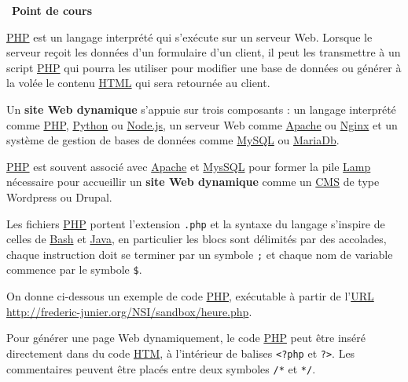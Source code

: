 \documentclass[
  11pt,
]{article}
\newcommand{\passthrough}[1]{#1}
\newcounter{cours}
\newenvironment{cours}[1]
{\par \medskip   \addtocounter{cours}{1} \noindent  
\begin{bclogo}[arrondi =0.1,  ombre = true, barre=none, logo=\bcbook, marge=4]{~\textbf{Point de cours} \textbf{\thecours} {\itshape #1} }  \par}
{
\end{bclogo}
 \par \bigskip }
\begin{document}
\begin{cours}{}

\href{https://developer.mozilla.org/fr/docs/Glossaire/PHP}{PHP} est un
langage interprété qui s'exécute sur un serveur Web. Lorsque le serveur
reçoit les données d'un formulaire d'un client, il peut les transmettre
à un script
\href{https://developer.mozilla.org/fr/docs/Glossaire/PHP}{PHP} qui
pourra les utiliser pour modifier une base de données ou générer à la
volée le contenu
\href{https://developer.mozilla.org/fr/docs/Glossaire/HTML}{HTML} qui
sera retournée au client.

Un \textbf{site Web dynamique} s'appuie sur trois composants : un
langage interprété comme
\href{https://developer.mozilla.org/fr/docs/Glossaire/PHP}{PHP},
\href{https://docs.python.org/3.7/library/cgi.html}{Python} ou
\href{https://developer.mozilla.org/fr/docs/Glossaire/Node.js}{Node.js},
un serveur Web comme \href{https://doc.ubuntu-fr.org/apache2}{Apache} ou
\href{https://doc.ubuntu-fr.org/nginx}{Nginx} et un système de gestion
de bases de données comme \href{https://doc.ubuntu-fr.org/mysql}{MySQL}
ou \href{https://doc.ubuntu-fr.org/mariadb}{MariaDb}.

\href{https://developer.mozilla.org/fr/docs/Glossaire/PHP}{PHP} est
souvent associé avec \href{https://doc.ubuntu-fr.org/apache2}{Apache} et
\href{https://doc.ubuntu-fr.org/mysql}{MysSQL} pour former la pile
\href{https://doc.ubuntu-fr.org/lamp}{Lamp} nécessaire pour accueillir
un \textbf{site Web dynamique} comme un
\href{https://developer.mozilla.org/fr/docs/Glossaire/CMS}{CMS} de type
Wordpress ou Drupal.

Les fichiers
\href{https://developer.mozilla.org/fr/docs/Glossaire/PHP}{PHP} portent
l'extension \passthrough{\lstinline!.php!} et la syntaxe du langage
s'inspire de celles de \href{https://doc.ubuntu-fr.org/bash}{Bash} et
\href{https://developer.mozilla.org/fr/docs/Glossaire/Java}{Java}, en
particulier les blocs sont délimités par des accolades, chaque
instruction doit se terminer par un symbole \passthrough{\lstinline!;!}
et chaque nom de variable commence par le symbole
\passthrough{\lstinline!$!}.

On donne ci-dessous un exemple de code
\href{https://developer.mozilla.org/fr/docs/Glossaire/PHP}{PHP},
exécutable à partir de
l'\href{https://developer.mozilla.org/fr/docs/Glossaire/URL}{URL}
\url{http://frederic-junier.org/NSI/sandbox/heure.php}.

Pour générer une page Web dynamiquement, le code
\href{https://developer.mozilla.org/fr/docs/Glossaire/PHP}{PHP} peut
être inséré directement dans du code
\href{https://developer.mozilla.org/fr/docs/Glossaire/HTML}{HTM}, à
l'intérieur de balises \passthrough{\lstinline!<?php!} et
\passthrough{\lstinline!?>!}. Les commentaires peuvent être placés entre
deux symboles \passthrough{\lstinline!/*!} et
\passthrough{\lstinline!*/!}.


\end{cours}
\end{document}
